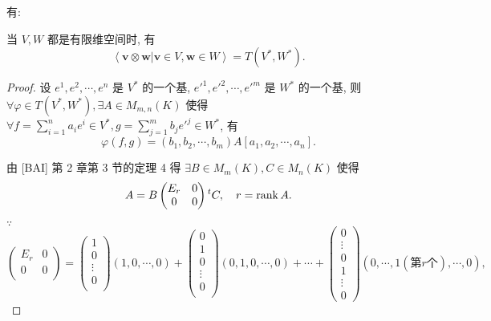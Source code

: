\documentclass{ctexart}
\begin{document}
有:
\begin{theorem}\label{t1.4}
    当 $V,W$ 都是有限维空间时, 有
    \[\left<\boldsymbol{v}\otimes\boldsymbol{w}|\boldsymbol{v}\in V,\boldsymbol{w}\in W\right>=T(V^*,W^*).\]
\end{theorem}
\begin{proof}
    设 $e^1,e^2,\cdots,e^n$ 是 $V^*$ 的一个基, $e'^1,e'^2,\cdots,e'^m$ 是 $W^*$ 的一个基, 则 $\forall \varphi\in T(V^*,W^*),\exists A\in M_{m,n}(K)$ 使得 $\forall f=\sum\limits_{i=1}^na_ie^i\in V^*,g=\sum\limits_{j=1}^mb_je'^j\in W^*$, 有
    \[\varphi(f,g)=(b_1,b_2,\cdots,b_m)A[a_1,a_2,\cdots,a_n].\]

    由 [BAI] 第 2 章第 3 节的定理 4 得 $\exists B\in M_m(K),C\in M_n(K)$ 使得
    \[A=B\begin{pmatrix}
        E_r & 0 \\
        0 & 0 \\
    \end{pmatrix}{}^tC,\quad r=\operatorname{rank} A.\]
    
    $\because$
    \[\begin{pmatrix}
        E_r & 0 \\
        0 & 0 \\
    \end{pmatrix}=\begin{pmatrix}
        1 \\
        0 \\
        \vdots \\
        0 \\
    \end{pmatrix}(1,0,\cdots,0)+\begin{pmatrix}
        0 \\
        1 \\
        0 \\
        \vdots \\
        0 \\
    \end{pmatrix}(0,1,0,\cdots,0)+\cdots+\begin{pmatrix}
        0 \\
        \vdots \\
        0 \\
        1 \\
        \vdots \\
        0
    \end{pmatrix}(0,\cdots,1(\text{第}r\text{个}),\cdots,0),\]


\end{proof}
\end{document}

